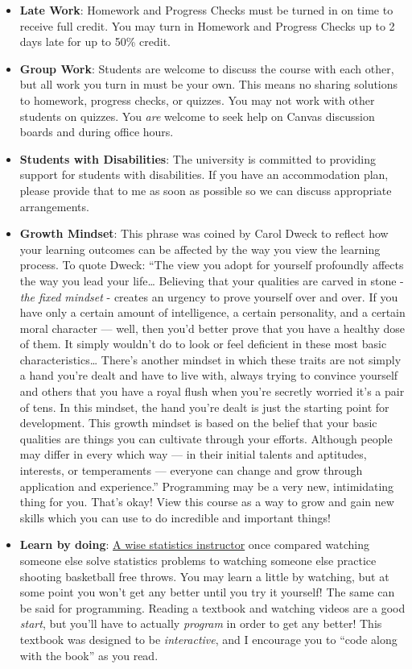 \documentclass[
]{article}
\providecommand{\tightlist}{%
  \setlength{\itemsep}{0pt}\setlength{\parskip}{0pt}}
\begin{document}
\begin{itemize}
\tightlist
\item
  \textbf{Late Work}: Homework and Progress Checks must be turned in on time to receive full credit. You may turn in Homework and Progress Checks up to 2 days late for up to 50\% credit.
\item
  \textbf{Group Work}: Students are welcome to discuss the course with each other, but all work you turn in must be your own. This means no sharing solutions to homework, progress checks, or quizzes. You may not work with other students on quizzes. You \emph{are} welcome to seek help on Canvas discussion boards and during office hours.
\item
  \textbf{Students with Disabilities}: The university is committed to providing support for students with disabilities. If you have an accommodation plan, please provide that to me as soon as possible so we can discuss appropriate arrangements.
\item
  \textbf{Growth Mindset}: This phrase was coined by Carol Dweck to reflect how your learning outcomes can be affected by the way you view the learning process. To quote Dweck: ``The view you adopt for yourself profoundly affects the way you lead your life\ldots{} Believing that your qualities are carved in stone - \emph{the fixed mindset} - creates an urgency to prove yourself over and over. If you have only a certain amount of intelligence, a certain personality, and a certain moral character --- well, then you'd better prove that you have a healthy dose of them. It simply wouldn't do to look or feel deficient in these most basic characteristics\ldots{} There's another mindset in which these traits are not simply a hand you're dealt and have to live with, always trying to convince yourself and others that you have a royal flush when you're secretly worried it's a pair of tens. In this mindset, the hand you're dealt is just the starting point for development. This growth mindset is based on the belief that your basic qualities are things you can cultivate through your efforts. Although people may differ in every which way --- in their initial talents and aptitudes, interests, or temperaments --- everyone can change and grow through application and experience.'' Programming may be a very new, intimidating thing for you. That's okay! View this course as a way to grow and gain new skills which you can use to do incredible and important things!
\item
  \textbf{Learn by doing}: \href{https://statistics.colostate.edu/person/?id=B0D2F899C79C05AAE4EDBA6EE2FECACA\&sq=t}{A wise statistics instructor} once compared watching someone else solve statistics problems to watching someone else practice shooting basketball free throws. You may learn a little by watching, but at some point you won't get any better until you try it yourself! The same can be said for programming. Reading a textbook and watching videos are a good \emph{start}, but you'll have to actually \emph{program} in order to get any better! This textbook was designed to be \emph{interactive}, and I encourage you to ``code along with the book'' as you read.
\end{itemize}
\end{document}
